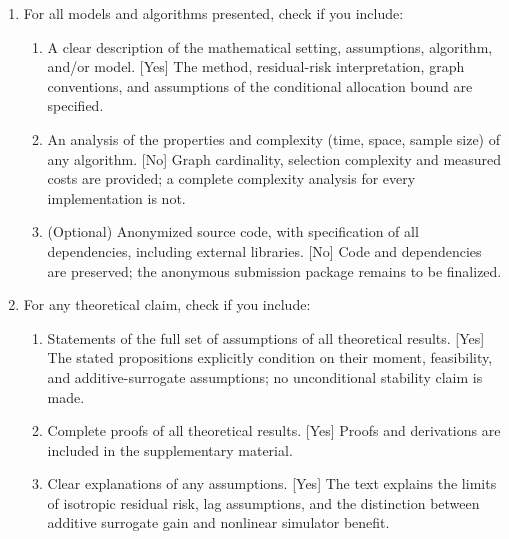 \begin{enumerate}

  \item For all models and algorithms presented, check if you include:
  \begin{enumerate}
    \item A clear description of the mathematical setting, assumptions, algorithm, and/or model. [Yes] The method, residual-risk interpretation, graph conventions, and assumptions of the conditional allocation bound are specified.
    \item An analysis of the properties and complexity (time, space, sample size) of any algorithm. [No] Graph cardinality, selection complexity and measured costs are provided; a complete complexity analysis for every implementation is not.
    \item (Optional) Anonymized source code, with specification of all dependencies, including external libraries. [No] Code and dependencies are preserved; the anonymous submission package remains to be finalized.
  \end{enumerate}

  \item For any theoretical claim, check if you include:
  \begin{enumerate}
    \item Statements of the full set of assumptions of all theoretical results. [Yes] The stated propositions explicitly condition on their moment, feasibility, and additive-surrogate assumptions; no unconditional stability claim is made.
    \item Complete proofs of all theoretical results. [Yes] Proofs and derivations are included in the supplementary material.
    \item Clear explanations of any assumptions. [Yes] The text explains the limits of isotropic residual risk, lag assumptions, and the distinction between additive surrogate gain and nonlinear simulator benefit.
  \end{enumerate}


\end{enumerate}
